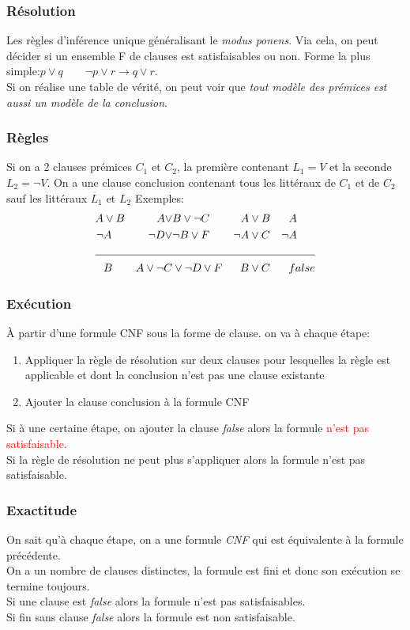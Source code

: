\documentclass{report}
\begin{document}
\subsubsection{Résolution}
Les règles d'inférence unique généralisant le \textit{modus ponens}. Via cela, on peut décider si un ensemble F de clauses est satisfaisables ou non. Forme la plus simple:$p \vee q \qquad \neg p \vee r \rightarrow q \vee r$.\\
Si on réalise une table de vérité, on peut voir que \textit{tout modèle des prémices est aussi un modèle de la conclusion}.

\subsubsection{Règles}
Si on a 2 clauses prémices $C_1$ et $C_2$, la première contenant $L_1=V$ et la seconde $L_2= \neg V$. On a une clause conclusion contenant tous les littéraux de $C_1$ et de $C_2$ sauf les littéraux $L_1$ et $L_2$
Exemples:
\begin{align*}
A &\vee B & A \vee &B \vee \neg C & A &\vee B & &A\\
\neg &A & \neg D \vee & \neg B \vee F & \neg A & \vee C & \neg & A \\
 \cline{1-8}
&B & A \vee \neg C & \vee \neg D \vee F & B &\vee C & &false 
\end{align*}

\subsubsection{Exécution}
À partir d'une formule CNF sous la forme de clause. on va à chaque étape:
\begin{enumerate}
\item Appliquer la règle de résolution sur deux clauses pour lesquelles la règle est applicable et dont la conclusion n'est pas une clause existante
\item Ajouter la clause conclusion à la formule CNF
\end{enumerate}
Si à une certaine étape, on ajouter la clause \textit{false} alors la formule \textcolor{red}{n'est pas satisfaisable}.\\
Si la règle de résolution ne peut plus s'appliquer alors la formule n'est pas satisfaisable.

\subsubsection{Exactitude}
On sait qu'à chaque étape, on a une formule \textit{CNF} qui est équivalente à la formule précédente.\\
On a un nombre de clauses distinctes, la formule est fini et donc son exécution se termine toujours.\\
Si une clause est \textit{false} alors la formule n'est pas satisfaisables.\\
Si fin sans clause \textit{false} alors la formule est non satisfaisable.
\end{document}
